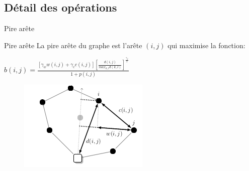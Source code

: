 \documentclass{beamer}
\begin{document}
\subsection{Détail des opérations}

\begin{frame}{Pire arête}
\begin{exampleblock}{Pire arête}
La pire arête du graphe est l'arête $(i,j)$ qui maximise la fonction:
\begin{center}
$b(i,j) = \frac{[\gamma_w w(i,j) + \gamma_c c(i,j)] [\frac{d(i,j)}{max_{k,l}d(k,l)}] ^ {\frac{\gamma_d}{2}}}{1+p(i,j)}$
\end{center}
\end{exampleblock}

\begin{figure}
\centering
\includegraphics[scale=0.6]{metrics.png}
\end{figure}

\end{frame}
\end{document}
